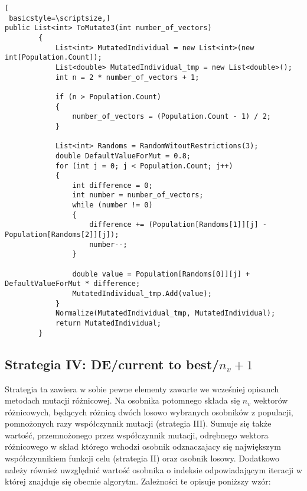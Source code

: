\begin{program}[h!]
\begin{lstlisting}[
 basicstyle=\scriptsize,]
public List<int> ToMutate3(int number_of_vectors)
        {
            List<int> MutatedIndividual = new List<int>(new int[Population.Count]);
            List<double> MutatedIndividual_tmp = new List<double>();
            int n = 2 * number_of_vectors + 1;

            if (n > Population.Count)
            {
                number_of_vectors = (Population.Count - 1) / 2;
            }

            List<int> Randoms = RandomWitoutRestrictions(3);
            double DefaultValueForMut = 0.8;
            for (int j = 0; j < Population.Count; j++)
            {
                int difference = 0;
                int number = number_of_vectors;
                while (number != 0)
                {
                    difference += (Population[Randoms[1]][j] - Population[Randoms[2]][j]);
                    number--;
                }

                double value = Population[Randoms[0]][j] + DefaultValueForMut * difference;
                MutatedIndividual_tmp.Add(value);
            }
            Normalize(MutatedIndividual_tmp, MutatedIndividual);
            return MutatedIndividual;
        }
\end{lstlisting}
\end{program}


\subsection{Strategia IV: DE/current to best/$n_{v} +1$}\label{sec:narzedzia}


Strategia ta zawiera w sobie pewne elementy zawarte we wcześniej opisanch metodach mutacji różnicowej. Na osobnika potomnego składa się  $n_{v}$ wektorów różnicowych, będących różnicą dwóch losowo wybranych osobników z populacji, pomnożonych razy współczynnik mutacji (strategia III). Sumuje się także wartość, przemnożonego przez współczynnik mutacji, odrębnego wektora różnicowego w skład którego wchodzi osobnik odznaczajacy się największym współczynnikiem funkcji celu (strategia II) oraz osobnik losowy. Dodatkowo należy również uwzględnić wartość osobnika o indeksie odpowiadającym iteracji w której znajduje się obecnie algorytm. Zależności te opisuje poniższy wzór:\\

